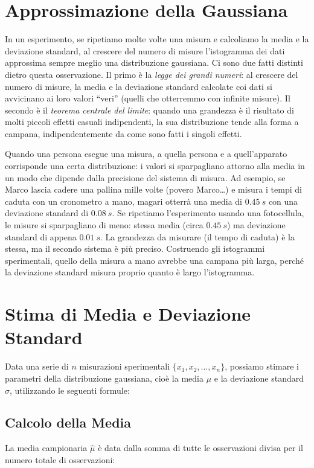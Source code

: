 \section{Approssimazione della Gaussiana}
In un esperimento, se ripetiamo molte volte una misura e calcoliamo la media e la deviazione standard, al crescere del numero di misure l'istogramma dei dati approssima sempre meglio una distribuzione gaussiana. Ci sono due fatti distinti dietro questa osservazione. Il primo è la \textit{legge dei grandi numeri}: al crescere del numero di misure, la media e la deviazione standard calcolate coi dati si avvicinano ai loro valori ``veri'' (quelli che otterremmo con infinite misure). Il secondo è il \textit{teorema centrale del limite}: quando una grandezza è il risultato di molti piccoli effetti casuali indipendenti, la sua distribuzione tende alla forma a campana, indipendentemente da come sono fatti i singoli effetti.

Quando una persona esegue una misura, a quella persona e a quell'apparato corrisponde una certa distribuzione: i valori si sparpagliano attorno alla media in un modo che dipende dalla precisione del sistema di misura. Ad esempio, se Marco lascia cadere una pallina mille volte (povero Marco\dots) e misura i tempi di caduta con un cronometro a mano, magari otterrà una media di $\SI{0,45}{s}$ con una deviazione standard di $\SI{0,08}{s}$. Se ripetiamo l'esperimento usando una fotocellula, le misure si sparpagliano di meno: stessa media (circa $\SI{0,45}{s}$) ma deviazione standard di appena $\SI{0,01}{s}$. La grandezza da misurare (il tempo di caduta) è la stessa, ma il secondo sistema è più preciso. Costruendo gli istogrammi sperimentali, quello della misura a mano avrebbe una campana più larga, perché la deviazione standard misura proprio quanto è largo l'istogramma. 

\section{Stima di Media e Deviazione Standard}
Data una serie di $n$ misurazioni sperimentali $\{x_1, x_2, \ldots, x_n\}$, possiamo stimare i parametri della distribuzione gaussiana, cioè la media $\mu$ e la deviazione standard $\sigma$, utilizzando le seguenti formule:

\subsection{Calcolo della Media}
La media campionaria $\hat{\mu}$ è data dalla somma di tutte le osservazioni divisa per il numero totale di osservazioni:

